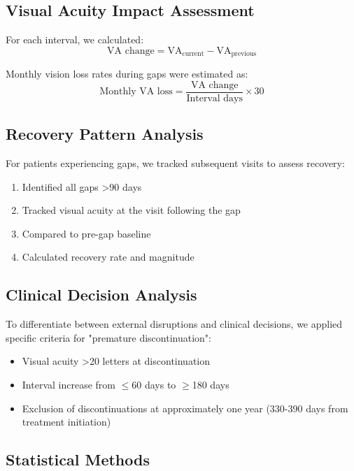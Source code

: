 \subsection{Visual Acuity Impact Assessment}

For each interval, we calculated:
\begin{equation}
\text{VA change} = \text{VA}_{\text{current}} - \text{VA}_{\text{previous}}
\end{equation}

Monthly vision loss rates during gaps were estimated as:
\begin{equation}
\text{Monthly VA loss} = \frac{\text{VA change}}{\text{Interval days}} \times 30
\end{equation}

\subsection{Recovery Pattern Analysis}

For patients experiencing gaps, we tracked subsequent visits to assess recovery:
\begin{enumerate}
    \item Identified all gaps >90 days
    \item Tracked visual acuity at the visit following the gap
    \item Compared to pre-gap baseline
    \item Calculated recovery rate and magnitude
\end{enumerate}

\subsection{Clinical Decision Analysis}

To differentiate between external disruptions and clinical decisions, we applied specific criteria for "premature discontinuation":
\begin{itemize}
    \item Visual acuity >20 letters at discontinuation
    \item Interval increase from $\leq$60 days to $\geq$180 days
    \item Exclusion of discontinuations at approximately one year (330-390 days from treatment initiation)
\end{itemize}

\subsection{Statistical Methods}

